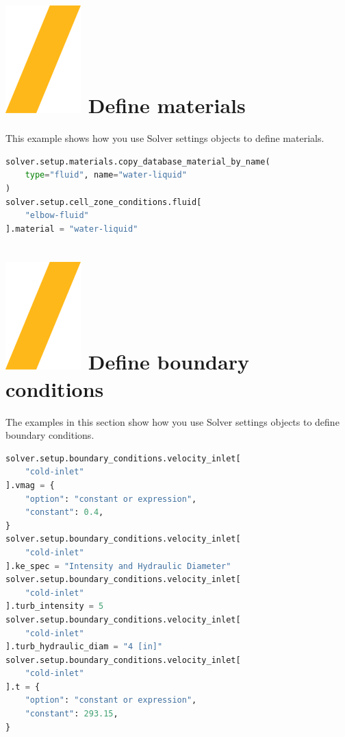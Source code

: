 \documentclass[9pt,landscape]{article}
\begin{document}
\begin{multicols}{3}
{%
\vfill
\section{\includegraphics[height=\fontcharht\font`\S]{slash.png}  Define materials}
This example shows how you use Solver settings objects to define materials.
\begin{lstlisting}[language=Python]
solver.setup.materials.copy_database_material_by_name(
    type="fluid", name="water-liquid"
)
solver.setup.cell_zone_conditions.fluid[
    "elbow-fluid"
].material = "water-liquid"
\end{lstlisting} 

\section{\includegraphics[height=\fontcharht\font`\S]{slash.png}  Define boundary conditions}

The examples in this section show how you use Solver settings objects to define boundary conditions.

\begin{lstlisting}[language=Python]
solver.setup.boundary_conditions.velocity_inlet[
    "cold-inlet"
].vmag = {
    "option": "constant or expression",
    "constant": 0.4,
}
solver.setup.boundary_conditions.velocity_inlet[
    "cold-inlet"
].ke_spec = "Intensity and Hydraulic Diameter"
solver.setup.boundary_conditions.velocity_inlet[
    "cold-inlet"
].turb_intensity = 5
solver.setup.boundary_conditions.velocity_inlet[
    "cold-inlet"
].turb_hydraulic_diam = "4 [in]"
solver.setup.boundary_conditions.velocity_inlet[
    "cold-inlet"
].t = {
    "option": "constant or expression",
    "constant": 293.15,
}
\end{lstlisting} 

}
\end{multicols}
\end{document}
